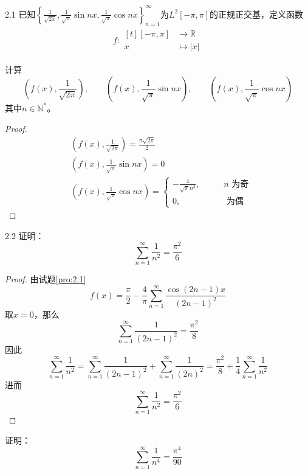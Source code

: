 \documentclass[lang = cn, scheme = chinese]{elegantbook}
\newcommand{\N}{\mathbb{N}}            %
\newcommand{\R}{\mathbb{R}}            %
\begin{document}
\begin{proposition}{}{2.1}
	已知$\left\{ \frac{1}{\sqrt{2\pi}},\frac{1}{\sqrt{\pi}}\sin nx,\frac{1}{\sqrt{\pi}}\cos nx \right\}_{n=1}^{\infty}$为$L^2[-\pi,\pi]$的正规正交基，定义函数
	\begin{align*}
		f:\begin{aligned}[t]
			[-\pi,\pi]&\longrightarrow \R\\
			x&\longmapsto |x|
		\end{aligned}
	\end{align*}
	
	计算
	$$
	\left(f(x),\frac{1}{\sqrt{2\pi}}\right),\qquad 
	\left(f(x),\frac{1}{\sqrt{\pi}}\sin nx\right),\qquad 
	\left(f(x),\frac{1}{\sqrt{\pi}}\cos nx\right)
	$$
	其中$n\in\N^*$。
\end{proposition}

\begin{proof}
	\begin{align*}
		&\left(f(x),\frac{1}{\sqrt{2\pi}}\right)=\frac{\pi\sqrt{2\pi}}{2}\\
		&\left(f(x),\frac{1}{\sqrt{\pi}}\sin nx\right)=0\\
		&\left(f(x),\frac{1}{\sqrt{\pi}}\cos nx\right)=\begin{cases}
			\displaystyle-\frac{4}{\sqrt{\pi}n^2},\qquad & n\text{ 为奇}\\
			0,\qquad & \text{ 为偶}
		\end{cases}
	\end{align*}
\end{proof}

\begin{proposition}{}{2.2}
	证明：
	$$
	\sum_{n=1}^{\infty}\frac{1}{n^2}=\frac{\pi^2}{6}
	$$
\end{proposition}

\begin{proof}
	由试题\ref{pro:2.1}
	$$
	f(x)=\frac{\pi}{2}-\frac{4}{\pi}\sum_{n=1}^{\infty}\frac{\cos(2n-1)x}{(2n-1)^2}
	$$
	取$x=0$，那么
	$$
	\sum_{n=1}^{\infty}\frac{1}{(2n-1)^2}=\frac{\pi^2}{8}
	$$
	因此
	$$
	\sum_{n=1}^{\infty}\frac{1}{n^2}
	=\sum_{n=1}^{\infty}\frac{1}{(2n-1)^2}+\sum_{n=1}^{\infty}\frac{1}{(2n)^2}
	=\frac{\pi^2}{8}+\frac{1}{4}\sum_{n=1}^{\infty}\frac{1}{n^2}
	$$
	进而
	$$
	\sum_{n=1}^{\infty}\frac{1}{n^2}=\frac{\pi^2}{6}
	$$
\end{proof}

\begin{proposition}
	证明：
	$$
	\sum_{n=1}^{\infty}\frac{1}{n^4}=\frac{\pi^4}{90}
	$$
\end{proposition}
\end{document}
